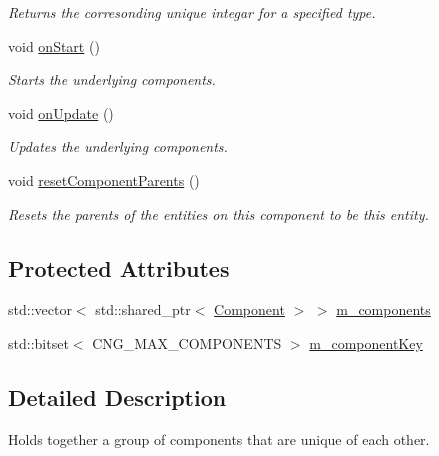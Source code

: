 \begin{DoxyCompactItemize}
\begin{DoxyCompactList}\small\item\em Returns the corresonding unique integar for a specified type. \end{DoxyCompactList}\item 
void \hyperlink{class_cookie_eng_1_1_e_c_s_1_1_entity_aa20c5dad3b6d92629cb6900ecd81a051}{on\+Start} ()
\begin{DoxyCompactList}\small\item\em Starts the underlying components. \end{DoxyCompactList}\item 
void \hyperlink{class_cookie_eng_1_1_e_c_s_1_1_entity_a6dde99658786478b528eb2cca86ba851}{on\+Update} ()
\begin{DoxyCompactList}\small\item\em Updates the underlying components. \end{DoxyCompactList}\item 
void \hyperlink{class_cookie_eng_1_1_e_c_s_1_1_entity_ac2074aee92bef04bdc4e3a8b430c4ad7}{reset\+Component\+Parents} ()
\begin{DoxyCompactList}\small\item\em Resets the parents of the entities on this component to be this entity. \end{DoxyCompactList}\end{DoxyCompactItemize}
\subsection*{Protected Attributes}
\begin{DoxyCompactItemize}
\item 
std\+::vector$<$ std\+::shared\+\_\+ptr$<$ \hyperlink{class_cookie_eng_1_1_e_c_s_1_1_component}{Component} $>$ $>$ \hyperlink{class_cookie_eng_1_1_e_c_s_1_1_entity_a5c8b8b6f07c07b97e898ece5dab38517}{m\+\_\+components}
\item 
std\+::bitset$<$ C\+N\+G\+\_\+\+M\+A\+X\+\_\+\+C\+O\+M\+P\+O\+N\+E\+N\+TS $>$ \hyperlink{class_cookie_eng_1_1_e_c_s_1_1_entity_ad57aaebd573658952dfa4ac9f1386f6d}{m\+\_\+component\+Key}
\end{DoxyCompactItemize}


\subsection{Detailed Description}
Holds together a group of components that are unique of each other. 

